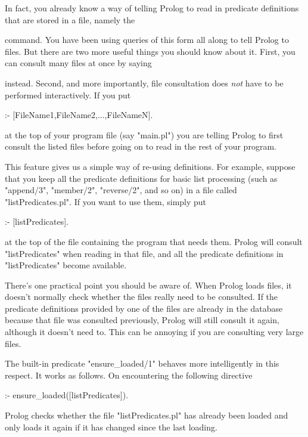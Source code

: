 In fact, you already know a way of telling Prolog to read in predicate
definitions that are stored in a file, namely the
\begin{LPNcodedisplay}
[FileName1]
\end{LPNcodedisplay}
command. You have been using queries of this form all along to tell
Prolog to  files. But there are two more useful things
you should know about it.  First, you can consult many files at once
by saying
\begin{LPNcodedisplay}
\end{LPNcodedisplay}
instead. Second, and more importantly,
file consultation does \textit{not} have
to be performed interactively. If you put
\begin{LPNcodedisplay}
:- [FileName1,FileName2,...,FileNameN].
\end{LPNcodedisplay}
at the top of your program file (say "main.pl") you are telling Prolog
to first consult the listed files before going on to read in the rest
of your program.


This feature gives us a simple way of re-using definitions.  For
example, suppose that you keep all the predicate definitions for basic
list processing (such as "append/3", "member/2", "reverse/2", and so
on) in a file called "listPredicates.pl". If you want to use them,
simply put
\begin{LPNcodedisplay}
:- [listPredicates].
\end{LPNcodedisplay}
at the top of the file  containing the program that needs
them. Prolog will consult "listPredicates" when reading in that file,
and all the predicate definitions in "listPredicates" become
available.

There's one practical point you should be aware of. When Prolog loads
files, it doesn't normally check whether the files really need to be
consulted. If the predicate definitions provided by one of the files
are already in the database because that file was consulted
previously, Prolog will still consult it again, although it doesn't
need to. This can be annoying if you are consulting very large
files.

The built-in predicate
"ensure_loaded/1" behaves more intelligently  in this respect.  It
works as follows. On encountering the following
directive
\begin{LPNcodedisplay}
:- ensure_loaded([listPredicates]).
\end{LPNcodedisplay}
Prolog checks whether the file "listPredicates.pl" has already been
loaded and only loads it again if it has changed since the last
loading.




